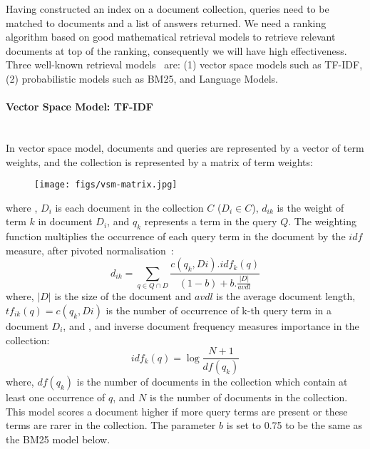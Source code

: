 Having constructed an index on a document collection, queries need to 
be matched to documents and a list of answers returned. We need a ranking algorithm based on good mathematical retrieval models to 
retrieve relevant documents at top of the ranking, consequently we will have high effectiveness. 
Three well-known retrieval models~\citep{croft2010search} are: (1) vector space models such as TF-IDF, (2) probabilistic models such as BM25, and Language Models. 

\paragraph{Vector Space Model: TF-IDF}
\ \\
In vector space model, documents and queries are represented by a vector of term weights, and the collection is represented by a matrix of term weights: 
\capstartfalse
\begin{figure}[htpb]
   \centering
   \texttt{[image: figs/vsm-matrix.jpg]}
\end{figure}
\capstarttrue
\FloatBarrier 
\noindent
where , $ D_{i} $ is each document in the collection $ C $ ($ D_{i}\in C $), $ d_{ik} $ is the weight of term $ k $ in document $ D_{i} $, and $ q_{k} $ represents a term in the query $ Q $.
The weighting function multiplies the occurrence of each query term in the document
by the $ idf $ measure, after pivoted normalisation~\citep{bache2010improving}:
\begin{equation}
d_{ik}=\sum\limits_{q \in Q\cap D}\frac{c(q_{k},Di).idf_{k}(q)}{(1-b)+b.\frac{|D|}{avdl}}
\label{eq:tfidf}
\end{equation}
where, $ |D| $ is the size of the document and $ avdl $ is the average document length, $ tf_{ik}(q)=c(q_{k},Di)$ is the number of occurrence of k-th query term in a document $ D_{i} $, and , and inverse document frequency measures importance in the collection: 
\begin{equation}
idf_{k}(q)=\log\frac{N+1}{df(q_{k})}
\label{eq:idf}
\end{equation}
where, $ df(q_{k}) $ is the number of documents in the collection which contain at least one occurrence of $ q $, and $ N $ is the number of documents in the collection. 
This model scores a document higher if more query terms are present or these terms are rarer in the collection. The parameter $ b $ is set to 0.75 to be the same as the BM25 model below.
